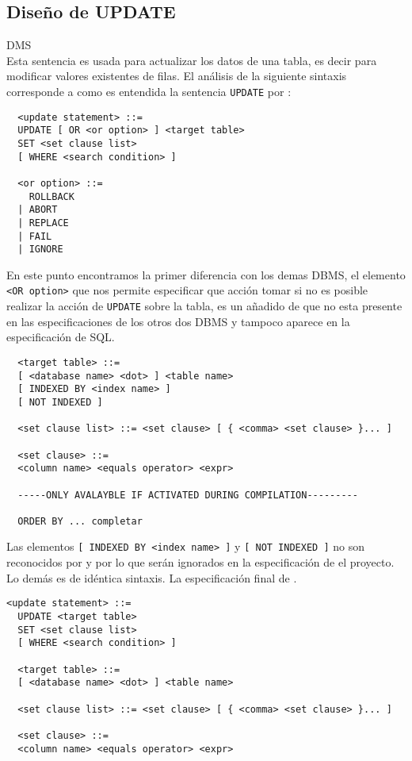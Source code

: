\subsection{Diseño de UPDATE}
DMS\\

Esta sentencia es usada para actualizar los datos de una tabla, es decir para modificar valores existentes de filas. El análisis de la siguiente sintaxis corresponde a como es entendida la sentencia \verb=UPDATE= por \s: 

\begin{Verbatim}
  <update statement> ::=
  UPDATE [ OR <or option> ] <target table> 
  SET <set clause list>
  [ WHERE <search condition> ]
  
  <or option> ::=
    ROLLBACK
  | ABORT
  | REPLACE
  | FAIL
  | IGNORE
\end{Verbatim}

En este punto encontramos la primer diferencia con los demas DBMS, el elemento \verb=<OR option>= que nos permite especificar que acción tomar si no es posible realizar la acción de \verb=UPDATE= sobre la tabla, es un añadido de \s que no esta presente en las especificaciones de los otros dos DBMS y tampoco aparece en la especificación de SQL.

\begin{Verbatim}
  <target table> ::=
  [ <database name> <dot> ] <table name>
  [ INDEXED BY <index name> ]
  [ NOT INDEXED ]
  
  <set clause list> ::= <set clause> [ { <comma> <set clause> }... ]

  <set clause> ::=
  <column name> <equals operator> <expr>
  
  -----ONLY AVALAYBLE IF ACTIVATED DURING COMPILATION---------
  
  ORDER BY ... completar

\end{Verbatim}
Las elementos \verb=[ INDEXED BY <index name> ]= y \verb=[ NOT INDEXED ]= no son reconocidos por \m y \p por lo que serán ignorados en la especificación de el proyecto. Lo demás es de idéntica sintaxis. La especificación final de \jj.
\begin{Verbatim}[frame=single, label=sintaxis para UPDATE]
  <update statement> ::=
  UPDATE <target table> 
  SET <set clause list>
  [ WHERE <search condition> ]
  
  <target table> ::=
  [ <database name> <dot> ] <table name>
  
  <set clause list> ::= <set clause> [ { <comma> <set clause> }... ]

  <set clause> ::=
  <column name> <equals operator> <expr>    
\end{Verbatim}




